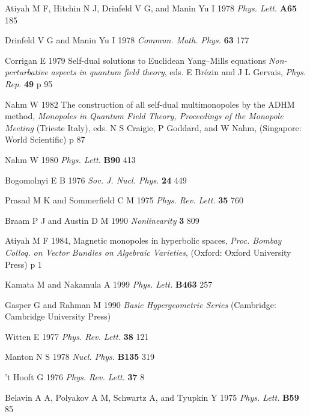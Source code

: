 \documentclass[a4paper,10pt]{article}
\begin{document}
\begin{thebibliography}{99}
 Atiyah M F, Hitchin N J, Drinfeld V G, and Manin Yu I 1978 {\it Phys. Lett.} \textbf{A65} 185

 Drinfeld V G and Manin Yu I 1978 {\it Commun. Math. Phys.} \textbf{63} 177

 Corrigan E 1979 Self-dual solutions to Euclidean Yang--Mills equations {\it Non-perturbative aspects in quantum field theory}, eds. E Br{\'e}zin and J L Gervais, {\it Phys. Rep.} \textbf{49} p 95


 Nahm W 1982 The construction of all self-dual multimonopoles by the ADHM method, {\it Monopoles in Quantum Field Theory, Proceedings of the Monopole Meeting} (Trieste Italy), eds. N S Craigie, P Goddard, and W Nahm, (Singapore: World Scientific) p 87

 Nahm W 1980 {\it Phys. Lett.} \textbf{B90} 413

 Bogomolnyi E B 1976 {\it Sov. J. Nucl. Phys.} \textbf{24} 449

 Prasad M K and Sommerfield C M 1975 {\it Phys. Rev. Lett.} \textbf{35} 760

 Braam P J and Austin D M 1990 {\it Nonlinearity} \textbf{3} 809

 Atiyah M F 1984, Magnetic monopoles in hyperbolic spaces, \textit{Proc. Bombay Colloq. on Vector Bundles on Algebraic Varieties}, (Oxford: Oxford University Press) p 1

 Kamata M and Nakamula A 1999 {\it Phys. Lett.} \textbf{B463} 257

 Gasper G and Rahman M 1990 {\it Basic Hypergeometric Series} (Cambridge: Cambridge University Press)
 
 Witten E 1977 {\it Phys. Rev. Lett.} \textbf{38} 121

 Manton N S 1978 {\it Nucl. Phys.} \textbf{B135} 319

 't Hooft G 1976 {\it Phys. Rev. Lett.} \textbf{37} 8

 Belavin A A, Polyakov A M, Schwartz A, and Tyupkin Y 1975 {\it Phys. Lett.} \textbf{B59} 85


\end{thebibliography}
\end{document}
